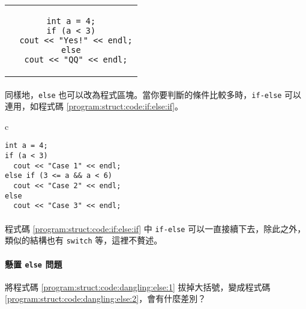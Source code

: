 \documentclass[12pt,a4paper,oneside]{article}
\begin{document}
\begin{CJK}{UTF8}{bkai}
\begin{code}[h!]
\centering
\begin{tabular}{c}
\begin{lstlisting}
int a = 4;
if (a < 3)
  cout << "Yes!" << endl;
else
  cout << "QQ" << endl;
\end{lstlisting}
\end{tabular}
\caption{\lstinline!if!\texttt{-}\lstinline!else! 結構}
\label{program:struct:code:if:else}
\end{code}

\paragraph{}同樣地，\lstinline!else! 也可以改為程式區塊。當你要判斷的條件比較多時，\lstinline!if!\texttt{-}\lstinline!else! 可以連用，如程式碼 \ref{program:struct:code:if:else:if}。

\begin{code}[h!]
\centering
\begin{tabular}{c}
\begin{lstlisting}
int a = 4;
if (a < 3)
  cout << "Case 1" << endl;
else if (3 <= a && a < 6)
  cout << "Case 2" << endl;
else
  cout << "Case 3" << endl;
\end{lstlisting}
\end{tabular}
\caption{\lstinline!if! 和 \lstinline!else! 連用}
\label{program:struct:code:if:else:if}
\end{code}

\paragraph{}程式碼 \ref{program:struct:code:if:else:if} 中 \lstinline!if!\texttt{-}\lstinline!else! 可以一直接續下去，除此之外，類似的結構也有 \lstinline!switch! 等，這裡不贅述。


\paragraph{懸置 \lstinline!else! 問題}將程式碼 \ref{program:struct:code:dangling:else:1} 拔掉大括號，變成程式碼 \ref{program:struct:code:dangling:else:2}，會有什麼差別？


\end{CJK}
\end{document}
